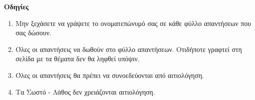 \documentclass[12pt]{article}
\begin{document}
\vfill
 \textbf{Οδηγίες}
 \begin{enumerate}
   \item Μην ξεχάσετε να γράψετε το ονοματεπώνυμό σας σε κάθε φύλλο απαντήσεων που σας δώσουν.
   \item Όλες οι απαντήσεις να δωθούν στο φύλλο απαντήσεων. Οτιδήποτε γραφτεί στη σελίδα με τα θέματα δεν θα ληφθεί υπόψιν.
   \item Όλες οι απαντήσεις θα πρέπει να συνοεδεύονται από αιτιολόγηση.
   \item Τα Σωστό - Λάθος δεν χρειάζονται αιτιολόγηση.
 \end{enumerate}
\end{document}

